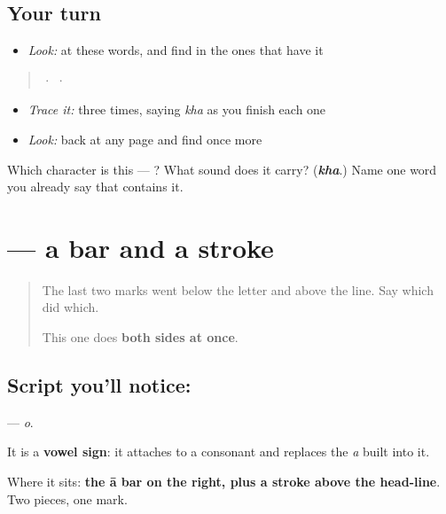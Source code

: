 \subsection*{Your turn}
\begin{itemize}
\raggedright
  \item \emph{Look:} at these words, and find  in the ones that have it
\end{itemize}

\begin{quote}
  ·    ·  
\end{quote}

\begin{itemize}
\raggedright
  \item \emph{Trace it:}  three times, saying \emph{kha} as you finish each one
  \item \emph{Look:} back at any page and find  once more
\end{itemize}

\begin{tcolorbox}[breakable,colback=teal!4,colframe=teal!35!black,title={Before you move on}]
Which character is this — ? What sound does it carry? (\emph{\textbf{kha}}.) Name one word you already say that contains it.
\end{tcolorbox}
\section[\texorpdfstring{\hi{ो} (o)}{ो (o)}]{ — a bar and a stroke}

\label{lesson:HI-S150-vowel-sign-o}



\begin{quote}
The last two marks went below the letter and above the line. Say which did which.

This one does \textbf{both sides at once}.
\end{quote}

\subsection*{Script you'll notice: }
\textbf{} — \emph{o}.

It is a \textbf{vowel sign}: it attaches to a consonant and replaces the \emph{a} built into it.

Where it sits: \textbf{the ā bar on the right, plus a stroke above the head-line}. Two pieces, one mark.

